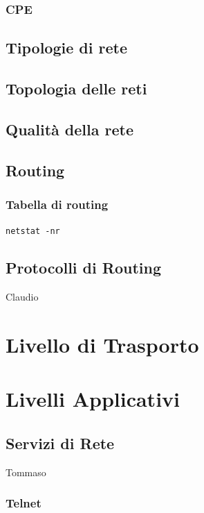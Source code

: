 \documentclass[a4paper,11pt]{paper}
\def\code#1{\texttt{#1}}
\begin{document}
\subsubsection{CPE}
\subsection{Tipologie di rete}
\subsection{Topologia delle reti}
\subsection{Qualità della rete}
\subsection{Routing}
\subsubsection{Tabella di routing}
\code{netstat -nr}
\subsection{Protocolli di Routing}
Claudio
\newpage
\section{Livello di Trasporto}
\newpage
\section{Livelli Applicativi}
\subsection{Servizi di Rete}
Tommaso
\subsubsection{Telnet}
\end{document}
